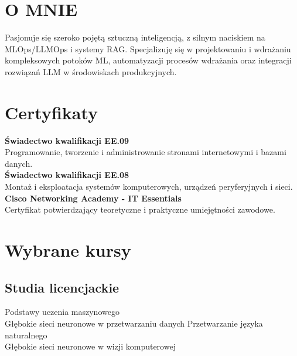 \documentclass[]{deedy-resume-openfont}
\begin{document}
\begin{minipage}[t]{0.4\textwidth} 


\section{O MNIE}
{Pasjonuje się szeroko pojętą sztuczną inteligencją, z silnym naciskiem na MLOps/LLMOps i systemy RAG. Specjalizuję się w projektowaniu i wdrażaniu kompleksowych potoków ML, automatyzacji procesów wdrażania oraz integracji rozwiązań LLM w środowiskach produkcyjnych.}


\section{Certyfikaty}
\textbf{Świadectwo kwalifikacji EE.09} \\
Programowanie, tworzenie i administrowanie stronami internetowymi i bazami danych. \\

\textbf{Świadectwo kwalifikacji EE.08} \\
Montaż i eksploatacja systemów komputerowych, urządzeń peryferyjnych i sieci. \\

\textbf{Cisco Networking Academy - IT Essentials} \\
Certyfikat potwierdzający teoretyczne i praktyczne umiejętności zawodowe. \\


\section{Wybrane kursy}
\subsection{Studia licencjackie}
Podstawy uczenia maszynowego \\
Głębokie sieci neuronowe w przetwarzaniu danych
Przetwarzanie języka naturalnego \\
Głębokie sieci neuronowe w wizji komputerowej


\end{minipage}
\end{document}
